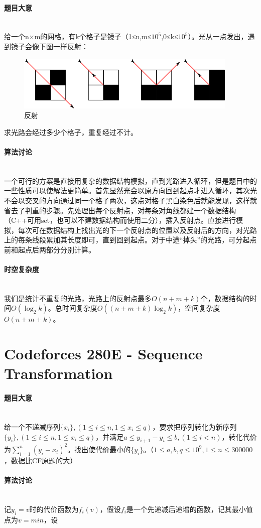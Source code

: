 \documentclass[UTF8]{ctexart}
\newcommand{\myparagraph}[1]{\paragraph{#1}\mbox{}\\}
\theoremstyle{nonumberplain}
\begin{document}
		\myparagraph{题目大意}
			
			给一个n×m的网格，有k个格子是镜子（1≤n,m≤$10^5$,0≤k≤$10^5$）。光从一点发出，遇到镜子会像下图一样反射：
			
			\begin{figure}[ht]
				\centering
				\includegraphics[width=\textwidth]{fig274e_1.png}
				\caption{反射}
			\end{figure}
			
			求光路会经过多少个格子，重复经过不计。
			
		\myparagraph{算法讨论}
		
			一个可行的方案是直接用复杂的数据结构模拟，直到光路进入循环，但是题目中的一些性质可以使解法更简单。首先显然光会以原方向回到起点才进入循环，其次光不会以交叉的方向通过同一个格子两次，这点对格子黑白染色后就能发现，这样就省去了判重的步骤。先处理出每个反射点，对每条对角线都建一个数据结构（C++可用set，也可以不建数据结构而使用二分），插入反射点。直接进行模拟，每次可在数据结构上找出光的下一个反射点的位置以及反射后的方向，对光路上的每条线段累加其长度即可，直到回到起点。对于中途“掉头”的光路，可分起点前和起点后两部分分别计算。
		
		\myparagraph{时空复杂度}
		
			我们是统计不重复的光路，光路上的反射点最多$O(n+m+k)$个，数据结构的时间$O(\log_2k)$。总时间复杂度$O((n+m+k)\log_2k)$，空间复杂度$O(n+m+k)$。
	
	\section{Codeforces 280E - Sequence Transformation}
	
		\myparagraph{题目大意}
		
			给一个不递减序列$\{x_i\},(1 \leq i \leq n, 1 \leq x_i \leq q)$，要求把序列转化为新序列$\{y_i\},(1 \leq i \leq n, 1 \leq x_i \leq q)$，并满足$a \leq y_{i+1}-y_i \leq b,(1 \leq i < n)$，转化代价为$\sum_{i=1}^n(y_i-x_i)^2$。找出使代价最小的$\{y_i\}$。（$1 \leq a,b,q \leq 10^9, 1 \leq n \leq 300000$，数据比CF原题的大）
		
		\myparagraph{算法讨论}
			
			记$y_i=v$时的代价函数为$f_i(v)$，假设$f_i$是一个先递减后递增的函数，记其最小值点为$v=min$，设
			
\end{document}
